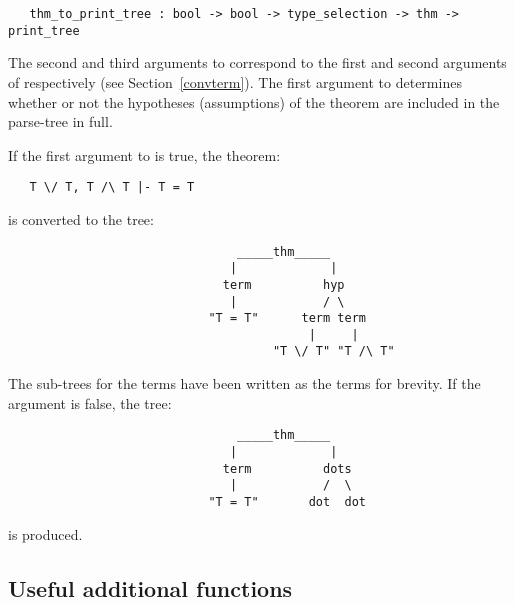 \begin{boxed}\begin{verbatim}
   thm_to_print_tree : bool -> bool -> type_selection -> thm -> print_tree
\end{verbatim}\end{boxed}

\noindent
The second and third arguments to  correspond to the
first and second arguments of  respectively (see
Section~\ref{convterm}). The first argument to 
determines whether or not the hypotheses (assumptions) of the theorem are
included in the parse-tree in full.

If the first argument to  is true, the theorem:

\begin{small}\begin{verbatim}
   T \/ T, T /\ T |- T = T
\end{verbatim}\end{small}

\noindent
is converted to the tree:

\begin{small}\begin{verbatim}
                                _____thm_____
                               |             |
                              term          hyp
                               |            / \
                            "T = T"      term term
                                          |     |
                                     "T \/ T" "T /\ T"
\end{verbatim}\end{small}

\noindent
The sub-trees for the terms have been written as the terms for brevity. If the
argument is false, the tree:

\begin{small}\begin{verbatim}
                                _____thm_____
                               |             |
                              term          dots
                               |            /  \
                            "T = T"       dot  dot
\end{verbatim}\end{small}

\noindent
is produced.


\subsection{Useful additional functions\label{otherconv}}

